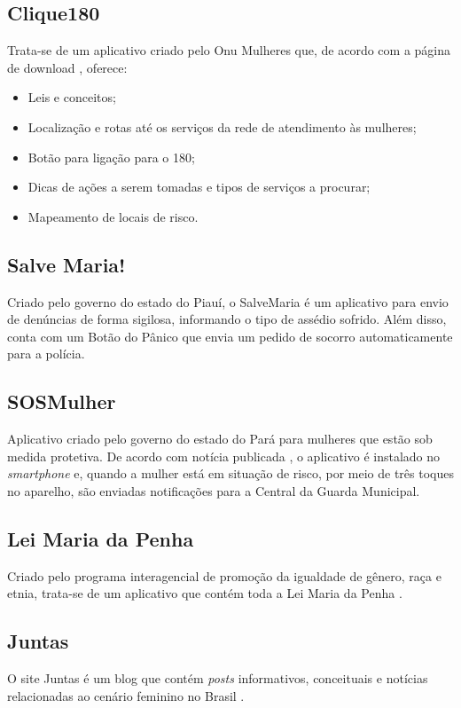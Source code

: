 \vfill

\subsection*{Clique180}
Trata-se de um aplicativo criado pelo Onu Mulheres que, de acordo com
a página de download \cite{clique_180}, oferece:

\begin{itemize}
	\item Leis e conceitos;
	\item Localização e rotas até os serviços da rede de atendimento às mulheres;
	\item Botão para ligação para o 180;
	\item Dicas de ações a serem tomadas e tipos de serviços a procurar; 
	\item Mapeamento de locais de risco.
\end{itemize}

\subsection*{Salve Maria!}
Criado pelo governo do estado do Piauí, o SalveMaria \cite{salvemaria} é um aplicativo para envio de denúncias
de forma sigilosa, informando o tipo de assédio sofrido.
Além disso, conta com um Botão do Pânico que envia um pedido de socorro automaticamente para a polícia.

\subsection*{SOSMulher}
Aplicativo criado pelo governo do estado do Pará para mulheres que estão sob medida protetiva. 
De acordo com notícia publicada \cite{sosmulher}, 
o aplicativo é instalado no \textit{smartphone} e, quando a mulher está em situação de risco, por meio de três toques no aparelho, são enviadas notificações para a Central da Guarda Municipal.

\subsection*{Lei Maria da Penha}
Criado pelo programa interagencial de promoção da igualdade de gênero, raça e etnia, trata-se de um
aplicativo que contém toda a Lei Maria da Penha \cite{leimariadapenha}.

\subsection*{Juntas}
O site Juntas é um blog que contém \textit{posts} informativos, conceituais e notícias 
relacionadas ao cenário feminino no Brasil \cite{juntas}.


